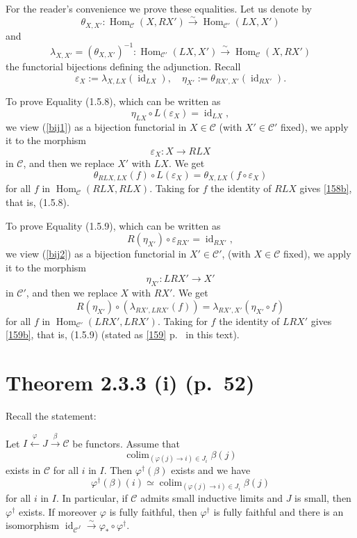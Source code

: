 \documentclass[12pt]{article}
\theoremstyle{remark}
\theoremstyle{definition}
\newcommand{\C}{\mathcal C}
\newcommand{\xr}{\xrightarrow}
\DeclareMathOperator*{\co}{colim}
\DeclareMathOperator{\id}{id}
\DeclareMathOperator{\Hom}{Hom}%
\begin{document}
For the reader's convenience we prove these equalities. Let us denote by 
%
\begin{equation}\label{bij1}
\theta_{X,X'}:\Hom_\C(X,RX')\overset\sim\to\Hom_{\C'}(LX,X')
\end{equation} 
%
and 
%
\begin{equation}\label{bij2}
\lambda_{X,X'}=(\theta_{X,X'})^{-1}:\Hom_{\C'}(LX,X')\overset\sim\to\Hom_\C(X,RX')
\end{equation} 
%
the functorial bijections defining the adjunction. Recall 
$$
\varepsilon_X:=\lambda_{X,LX}(\id_{LX}),\quad\eta_{X'}:=\theta_{RX',X'}(\id_{RX'}).
$$ 

To prove Equality (1.5.8), which can be written as 
%
\begin{equation}\label{158b} 
\eta_{LX}\circ L(\varepsilon_X)=\id_{LX}, 
\end{equation}
%
we view (\ref{bij1}) as a bijection functorial in $X\in\C$ (with $X'\in\C'$ fixed), we apply it to the morphism 
$$
\varepsilon_X:X\to RLX
$$ 
in $\C$, and then we replace $X'$ with $LX$. We get 
$$
\theta_{RLX,LX}(f)\circ L(\varepsilon_X)=\theta_{X,LX}(f\circ\varepsilon_X)
$$
for all $f$ in $\Hom_\C(RLX,RLX)$. Taking for $f$ the identity of $RLX$ gives \eqref{158b}, that is, (1.5.8).

To prove Equality (1.5.9), which can be written as 
%
\begin{equation}\label{159b} 
R(\eta_{X'})\circ\varepsilon_{RX'}=\id_{RX'},
\end{equation}
%
we view (\ref{bij2}) as a bijection functorial in $X'\in\C'$, (with $X\in\C$ fixed), we apply it to the morphism 
$$
\eta_{X'}:LRX'\to X'
$$ 
in $\C'$, and then we replace $X$ with $RX'$. We get 
$$
R(\eta_{X'})\circ(\lambda_{RX',LRX'}(f))=\lambda_{RX',X'}(\eta_{X'}\circ f)
$$
for all $f$ in $\Hom_{\C'}(LRX',LRX')$. Taking for $f$ the identity of $LRX'$ gives \eqref{159b}, that is, (1.5.9) (stated as \eqref{159} p.~\pageref{159} in this text). 
%
%
\section{Theorem 2.3.3 (i) (p.~52)}\label{233i} %
%
Recall the statement: 

Let $I\xleftarrow\varphi J\xr\beta\C$ be functors. Assume that 
$$
\co_{(\varphi(j)\to i)\in J_i}\beta(j)
$$ 
exists in $\C$ for all $i$ in $I$. Then $\varphi^\dagger(\beta)$ exists and we have 
%
\begin{equation}\label{236} 
\varphi^\dagger(\beta)(i)\simeq\co_{(\varphi(j)\to i)\in J_i}\beta(j)
\end{equation} 
%
for all $i$ in $I$. In particular, if $\C$ admits small inductive limits and $J$ is small, then 
$\varphi^\dagger$ exists. If moreover $\varphi$ is fully faithful, then $\varphi^\dagger$ is fully faithful and there is an isomorphism $\id_{\C^J}\xr\sim\varphi_*\circ\varphi^\dagger$. 
\end{document}
